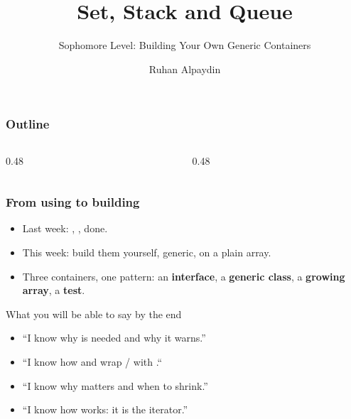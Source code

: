 \documentclass[aspectratio=169,10pt,compress]{beamer}
\title{Set, Stack and Queue}
\subtitle{Sophomore Level: Building Your Own Generic Containers}
\author[Bingol]{Ruhan Alpaydin}
\institute[FCIS]{
    Faculty of Computer and Information Sciences\\
    Yeditepe University
}
\date{
	{\tiny \hbTimeStamp}
}
\begin{document}
\begin{frame}[t,fragile]
  \titlepage
\end{frame}




\begin{frame}[t,fragile] \frametitle{Outline}
  \begin{columns}[T]
    \begin{column}{0.48\textwidth}
      \tableofcontents[sections={1-4}, hideallsubsections]
    \end{column}
    \begin{column}{0.48\textwidth}
      \tableofcontents[sections={5-8}, hideallsubsections]
    \end{column}
  \end{columns}
\end{frame}





\begin{frame}[t,fragile] \frametitle{From using to building}
  \begin{itemize}
    \item Last week: , , done.
    \item This week: build them yourself, generic, on a plain array.
    \item Three containers, one pattern: an \textbf{interface},
          a \textbf{generic class}, a \textbf{growing array}, a
          \textbf{test}.
  \end{itemize}
  \begin{block}{What you will be able to say by the end}
    \small
    \begin{itemize}
      \item ``I know why  is needed and why it warns.''
      \item ``I know how  and  wrap / with \hCode{\%}.``
      \item ``I know why  matters and when to shrink.''
      \item ``I know how  works: it is the iterator.''
    \end{itemize}
  \end{block}
\end{frame}
\end{document}
